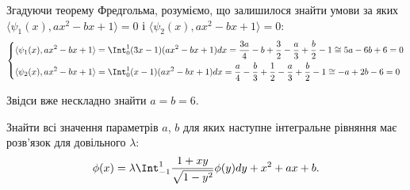 \begin{solution}
    Згадуючи теорему Фредгольма, розуміємо, що залишилося знайти умови за яких $\langle \psi_1(x), ax^2 - bx + 1\rangle = 0$ і $\langle \psi_2(x), ax^2 - bx + 1\rangle = 0$:
    \begin{equation*}
        \left\{
            \begin{aligned}
                \langle \psi_1(x), ax^2  - bx + 1\rangle &= \Int_0^1 (3 x - 1) (ax^2  - bx + 1) dx = \dfrac {3a} 4 - b + \dfrac 32 - \dfrac a3 + \dfrac b2 - 1 \cong 5a - 6b + 6 = 0 \\
                \langle \psi_2(x), ax^2  - bx + 1\rangle &= \Int_0^1 (x - 1) (ax^2  - bx + 1) dx = \dfrac a4 - \dfrac b3 + \dfrac 12 - \dfrac a3 + \dfrac b2 - 1 \cong -a + 2b - 6 = 0 \\
            \end{aligned}
        \right.
    \end{equation*}
    
    Звідси вже нескладно знайти $a = b = 6$.
\end{solution}

\begin{problem}[5.26.3, Владимиров]
    Знайти всі значення параметрів $a$, $b$ для яких наступне інтегральне рівняння має розв'язок для довільного $\lambda$:
    \[
        \phi(x) = \lambda \Int_{-1}^1 \dfrac{1 + xy}{\sqrt{1 - y^2}} \phi(y) dy + x^2 + ax + b. 
    \]
\end{problem}

